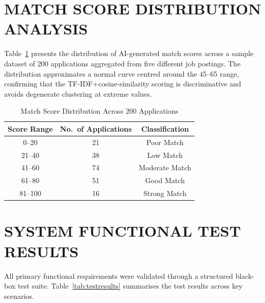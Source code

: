 \documentclass[12pt,a4paper]{report}
\begin{document}
\section{MATCH SCORE DISTRIBUTION ANALYSIS}

Table~\ref{tab:distrib} presents the distribution of AI-generated match scores across a sample dataset of 200 applications aggregated from five different job postings. The distribution approximates a normal curve centred around the 45--65 range, confirming that the TF-IDF+cosine-similarity scoring is discriminative and avoids degenerate clustering at extreme values.

\begin{table}[H]
    \centering
    \caption{Match Score Distribution Across 200 Applications}
    \label{tab:distrib}
    \begin{tabular}{|c|c|c|}
        \hline
        \textbf{Score Range} & \textbf{No.\ of Applications} & \textbf{Classification} \\
        \hline
        0--20   & 21  & Poor Match \\
        21--40  & 38  & Low Match \\
        41--60  & 74  & Moderate Match \\
        61--80  & 51  & Good Match \\
        81--100 & 16  & Strong Match \\
        \hline
    \end{tabular}
\end{table}

\section{SYSTEM FUNCTIONAL TEST RESULTS}

All primary functional requirements were validated through a structured black-box test suite. Table~\ref{tab:testresults} summarises the test results across key scenarios.
\end{document}
